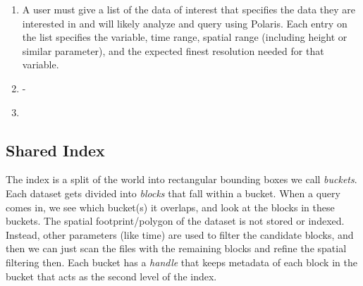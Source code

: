 \begin{enumerate}
    \item A user must give a list of the data of interest that specifies the data they are interested in and will likely analyze and query using Polaris. Each entry on the list specifies the variable, time range, spatial range (including height or similar parameter), and the expected finest resolution needed for that variable.
    \item -
    \item 
\end{enumerate}

\subsection{Shared Index}
The index is a split of the world into rectangular bounding boxes we call \emph{buckets}. Each dataset gets divided into \emph{blocks} that fall within a bucket. When a query comes in, we see which bucket(s) it overlaps, and look at the blocks in these buckets. The spatial footprint/polygon of the dataset is not stored or indexed. Instead, other parameters (like time) are used to filter the candidate blocks, and then we can just scan the files with the remaining blocks and refine the spatial filtering then. Each bucket has a \emph{handle} that keeps metadata of each block in the bucket that acts as the second level of the index.


